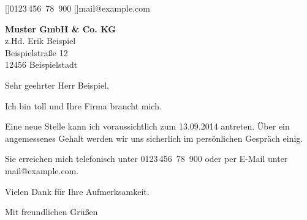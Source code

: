 \documentclass[a4paper, parskip=full*, fromalign=right, fromphone, fromemail]{scrlttr2}
\begin{document}
\pagestyle{plain}
[\Telefon\enskip]{0123\,456~78~900}
[\Email\enskip]{mail@example.com}
\begin{letter}{\textbf{Muster GmbH & Co. KG}\\z.Hd. Erik Beispiel\\Beispielstraße 12\\12456 Beispielstadt} 
\opening{Sehr geehrter Herr Beispiel,} 
Ich bin toll und Ihre Firma braucht mich.

Eine neue Stelle kann ich voraussichtlich zum 13.09.2014 antreten. Über ein angemessenes Gehalt werden wir uns sicherlich im persönlichen Gespräch einig.

Sie erreichen mich telefonisch unter 0123\,456~78~900 oder per E-Mail unter mail@example.com.

Vielen Dank für Ihre Aufmerksamkeit.

\closing{Mit freundlichen Grüßen}
\end{letter} 
\end{document}
